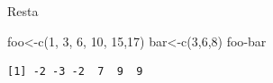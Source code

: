\documentclass[
  ignorenonframetext,
  aspectratio=169,
  spanish,
]{beamer}
\newenvironment{Shaded}{\begin{snugshade}}{\end{snugshade}}
\newcommand{\DecValTok}[1]{\textcolor[rgb]{0.68,0.00,0.00}{#1}}
\newcommand{\FunctionTok}[1]{\textcolor[rgb]{0.28,0.35,0.67}{#1}}
\newcommand{\NormalTok}[1]{\textcolor[rgb]{0.00,0.23,0.31}{#1}}
\newcommand{\OtherTok}[1]{\textcolor[rgb]{0.00,0.23,0.31}{#1}}
\newcommand{\SpecialCharTok}[1]{\textcolor[rgb]{0.37,0.37,0.37}{#1}}
\begin{document}
\begin{frame}[fragile]{Resta}
\label{resta}
\begin{Shaded}
\begin{Highlighting}[]
\NormalTok{foo}\OtherTok{\textless{}{-}}\FunctionTok{c}\NormalTok{(}\DecValTok{1}\NormalTok{, }\DecValTok{3}\NormalTok{, }\DecValTok{6}\NormalTok{, }\DecValTok{10}\NormalTok{, }\DecValTok{15}\NormalTok{,}\DecValTok{17}\NormalTok{)}
\NormalTok{bar}\OtherTok{\textless{}{-}}\FunctionTok{c}\NormalTok{(}\DecValTok{3}\NormalTok{,}\DecValTok{6}\NormalTok{,}\DecValTok{8}\NormalTok{)}
\NormalTok{foo}\SpecialCharTok{{-}}\NormalTok{bar}
\end{Highlighting}
\end{Shaded}

\begin{verbatim}
[1] -2 -3 -2  7  9  9
\end{verbatim}
\end{frame}
\end{document}
